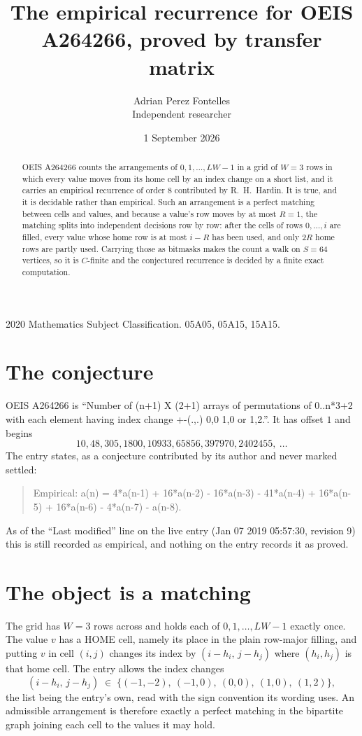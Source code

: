 \documentclass[11pt,a4paper]{article}
\title{The empirical recurrence for OEIS A264266, proved by transfer matrix}
\author{Adrian Perez Fontelles\\ \small Independent researcher}
\date{1 September 2026}
\theoremstyle{plain}
\theoremstyle{definition}
\begin{document}
\maketitle

\begin{abstract}
OEIS A264266 counts the arrangements of $0,1,\dots,LW-1$ in a grid of $W=3$ rows in which
every value moves from its home cell by an index change on a short list, and it carries an
empirical recurrence of order $8$ contributed by R.~H.~Hardin. It is true, and it is
decidable rather than empirical. Such an arrangement is a perfect matching between cells and
values, and because a value's row moves by at most $R=1$, the matching splits into
independent decisions row by row: after the cells of rows $0,\dots,i$ are filled,
every value whose home row is at most $i-R$ has been used, and only $2R$ home rows are
partly used. Carrying those as bitmasks makes the count a walk on $S=64$ vertices, so it is
$C$-finite and the conjectured recurrence is decided by a finite exact computation.
\end{abstract}

\noindent\small 2020 Mathematics Subject Classification. 05A05, 05A15, 15A15.\normalsize

\section{The conjecture}

OEIS A264266 is ``Number of (n+1) X (2+1) arrays of permutations of 0..n*3+2 with each element having index change +-(.,.) 0,0 1,0 or 1,2.''. It has offset $1$ and begins
\[
10, 48, 305, 1800, 10933, 65856, 397970, 2402455,\ \dots
\]
The entry states, as a conjecture contributed by its author and never marked settled:
\begin{quote}
Empirical: a(n) = 4*a(n-1) + 16*a(n-2) - 16*a(n-3) - 41*a(n-4) + 16*a(n-5) + 16*a(n-6) - 4*a(n-7) - a(n-8).
\end{quote}
As of the ``Last modified'' line on the live entry (Jan 07 2019 05:57:30, revision 9) this is still
recorded as empirical, and nothing on the entry records it as proved.

\section{The object is a matching}

The grid has $W=3$ rows across and holds each of $0,1,\dots,LW-1$ exactly once. The value
$v$ has a HOME cell, namely its place in the plain row-major filling, and putting $v$ in cell
$(i,j)$ changes its index by $(i-h_i,\,j-h_j)$ where $(h_i,h_j)$ is that home cell. The entry
allows the index changes
\[
(i-h_i,\,j-h_j)\;\in\;\{(-1,-2),\ (-1,0),\ (0,0),\ (1,0),\ (1,2)\},
\]
the list being the entry's own, read with the sign convention its wording uses. An admissible
arrangement is therefore exactly a perfect matching in the bipartite graph joining each cell to
the values it may hold.
\end{document}
